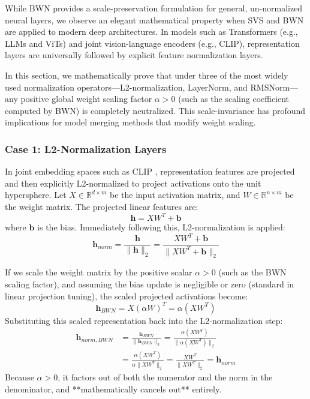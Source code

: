 While BWN provides a scale-preservation formulation for general, un-normalized neural layers, we observe an elegant mathematical property when SVS and BWN are applied to modern deep architectures. In models such as Transformers (e.g., LLMs and ViTs) and joint vision-language encoders (e.g., CLIP), representation layers are universally followed by explicit feature normalization layers. 

In this section, we mathematically prove that under three of the most widely used normalization operators—L2-normalization, LayerNorm, and RMSNorm—any positive global weight scaling factor $\alpha > 0$ (such as the scaling coefficient computed by BWN) is completely neutralized. This scale-invariance has profound implications for model merging methods that modify weight scaling.

\subsubsection{Case 1: L2-Normalization Layers}
In joint embedding spaces such as CLIP \cite{radford2021learning}, representation features are projected and then explicitly L2-normalized to project activations onto the unit hypersphere. Let $X \in \mathbb{R}^{d \times m}$ be the input activation matrix, and $W \in \mathbb{R}^{n \times m}$ be the weight matrix. The projected linear features are:
\begin{equation}
    \mathbf{h} = X W^T + \mathbf{b}
\end{equation}
where $\mathbf{b}$ is the bias. Immediately following this, L2-normalization is applied:
\begin{equation}
    \mathbf{h}_{norm} = \frac{\mathbf{h}}{\|\mathbf{h}\|_2} = \frac{X W^T + \mathbf{b}}{\|X W^T + \mathbf{b}\|_2}
\end{equation}

If we scale the weight matrix by the positive scalar $\alpha > 0$ (such as the BWN scaling factor), and assuming the bias update is negligible or zero (standard in linear projection tuning), the scaled projected activations become:
\begin{equation}
    \mathbf{h}_{BWN} = X (\alpha W)^T = \alpha (X W^T)
\end{equation}
Substituting this scaled representation back into the L2-normalization step:
\begin{align}
    \mathbf{h}_{norm, BWN} &= \frac{\mathbf{h}_{BWN}}{\|\mathbf{h}_{BWN}\|_2} = \frac{\alpha (X W^T)}{\|\alpha (X W^T)\|_2} \nonumber \\
    &= \frac{\alpha (X W^T)}{\alpha \|X W^T\|_2} = \frac{X W^T}{\|X W^T\|_2} = \mathbf{h}_{norm}
\end{align}
Because $\alpha > 0$, it factors out of both the numerator and the norm in the denominator, and **mathematically cancels out** entirely.

